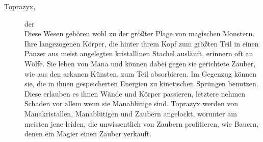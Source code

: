 \documentclass[a4paper,12pt,oneside]{book}
\begin{document}
\begin{description}
\item[Toprazyx,] der
\\Diese Wesen gehören wohl zu der größter Plage von magischen Monstern. Ihre langezogenen Körper, die hinter ihrem Kopf zum größten Teil in einen Panzer aus meist angelegten kristallinen Stachel ausläuft, erinnern oft an Wölfe. Sie leben von Mana und können dabei gegen sie gerichtete Zauber, wie aus den arkanen Künsten, zum Teil absorbieren. Im Gegenzug können sie, die in ihnen gespeicherten Energien zu kinetischen Sprüngen benutzen. Diese erlauben es ihnen Wände und Körper passieren, letztere nehmen Schaden vor allem wenn sie Manablütige sind. Toprazyx werden von Manakristallen, Manablütigen und Zaubern angelockt, worunter am meisten jene leiden, die unwissentlich von Zaubern profitieren, wie Bauern, denen ein Magier einen Zauber verkauft.

\end{description}
\end{document}
